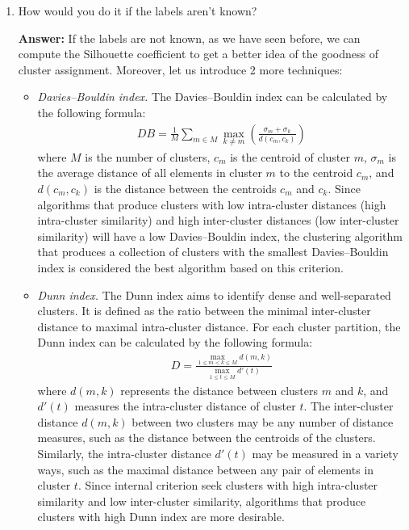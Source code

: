 \documentclass{article}
\newenvironment{QandA}{\begin{enumerate}[label=\arabic*.]}{\end{enumerate}}
\newenvironment{InnerQandA}{\begin{enumerate}[label=\roman*.]}{\end{enumerate}}
\newenvironment{answer}{\par\normalfont \textbf{Answer:}}{}
\begin{document}
\begin{QandA}
\begin{InnerQandA}
        \item How would you do it if the labels aren’t known?
        \begin{answer}
            If the labels are not known, as we have seen before, we can compute the Silhouette coefficient to get a better idea of the goodness of cluster assignment. Moreover, let us introduce 2 more techniques:
            \begin{itemize}
                \item \textit{Davies–Bouldin index.} The Davies–Bouldin index can be calculated by the following formula:
                \begin{align*}
                    DB = \frac{1}{M}\sum_{m \in M} \max_{k \neq m} \left( \frac{\sigma_m + \sigma_k}{d(c_m, c_k)} \right)
                \end{align*}
                where $M$ is the number of clusters, $c_m$ is the centroid of cluster $m$, $\sigma_m$ is the average distance of all elements in cluster $m$ to the centroid $c_m$, and $d(c_m, c_k)$ is the distance between the centroids $c_m$ and $c_k$. Since algorithms that produce clusters with low intra-cluster distances (high intra-cluster similarity) and high inter-cluster distances (low inter-cluster similarity) will have a low Davies–Bouldin index, the clustering algorithm that produces a collection of clusters with the smallest Davies–Bouldin index is considered the best algorithm based on this criterion. 

                \item \textit{Dunn index.} The Dunn index aims to identify dense and well-separated clusters. It is defined as the ratio between the minimal inter-cluster distance to maximal intra-cluster distance. For each cluster partition, the Dunn index can be calculated by the following formula:
                \begin{align*}
                    D = \frac{\max_{1 \le m < k \le M}d(m, k)}{\max_{1 \le t \le M} d'(t)}
                \end{align*}
                where $d(m, k)$ represents the distance between clusters $m$ and $k$, and $d'(t)$ measures the intra-cluster distance of cluster $t$. The inter-cluster distance $d(m,k)$ between two clusters may be any number of distance measures, such as the distance between the centroids of the clusters. Similarly, the intra-cluster distance $d'(t)$ may be measured in a variety ways, such as the maximal distance between any pair of elements in cluster $t$. Since internal criterion seek clusters with high intra-cluster similarity and low inter-cluster similarity, algorithms that produce clusters with high Dunn index are more desirable.
            \end{itemize}
        \end{answer}


\end{InnerQandA}
\end{QandA}
\end{document}
